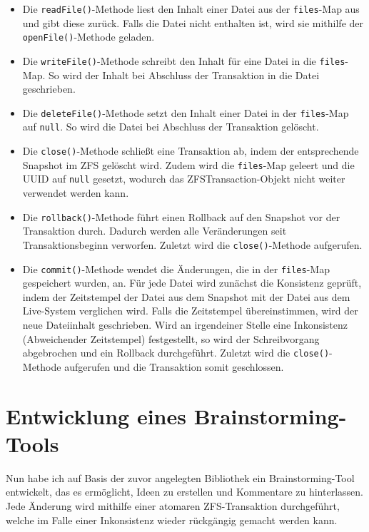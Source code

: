 \documentclass[12pt]{article}
\begin{document}
\begin{itemize}
	\item Die \texttt{readFile()}-Methode liest den Inhalt einer Datei aus der \texttt{files}-Map aus und gibt diese zurück.
	Falls die Datei nicht enthalten ist, wird sie mithilfe der \texttt{openFile()}-Methode geladen.
	
	\item Die \texttt{writeFile()}-Methode schreibt den Inhalt für eine Datei in die \texttt{files}-Map.
	So wird der Inhalt bei Abschluss der Transaktion in die Datei geschrieben.
	
	\item Die \texttt{deleteFile()}-Methode setzt den Inhalt einer Datei in der \texttt{files}-Map auf \texttt{null}.
	So wird die Datei bei Abschluss der Transaktion gelöscht.
	
	\item Die \texttt{close()}-Methode schließt eine Transaktion ab, indem der entsprechende Snapshot im ZFS gelöscht wird.
	Zudem wird die \texttt{files}-Map geleert und die UUID auf \texttt{null} gesetzt, wodurch das ZFSTransaction-Objekt nicht weiter verwendet werden kann.
	
	\item Die \texttt{rollback()}-Methode führt einen Rollback auf den Snapshot vor der Transaktion durch. 
	Dadurch werden alle Veränderungen seit Transaktionsbeginn verworfen.
	Zuletzt wird die \texttt{close()}-Methode aufgerufen.
	
	\item Die \texttt{commit()}-Methode wendet die Änderungen, die in der \texttt{files}-Map gespeichert wurden, an.
	Für jede Datei wird zunächst die Konsistenz geprüft, indem der Zeitstempel der Datei aus dem Snapshot mit der Datei aus dem Live-System verglichen wird.
	Falls die Zeitstempel übereinstimmen, wird der neue Dateiinhalt geschrieben.
	Wird an irgendeiner Stelle eine Inkonsistenz (Abweichender Zeitstempel) festgestellt, so wird der Schreibvorgang abgebrochen und ein Rollback durchgeführt.
	Zuletzt wird die \texttt{close()}-Methode aufgerufen und die Transaktion somit geschlossen.
\end{itemize}

\section*{Entwicklung eines Brainstorming-Tools}
Nun habe ich auf Basis der zuvor angelegten Bibliothek ein Brainstorming-Tool entwickelt, das es ermöglicht, Ideen zu erstellen und Kommentare zu hinterlassen.
Jede Änderung wird mithilfe einer atomaren ZFS-Transaktion durchgeführt, welche im Falle einer Inkonsistenz wieder rückgängig gemacht werden kann.
\end{document}
